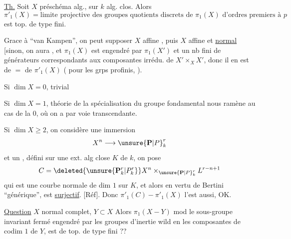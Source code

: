 \uline{Th.} Soit $X$ préschéma alg., sur $k$ alg. clos. Alors
\[
\pi'_1(X)=\text{limite projective des groupes quotients discrets de }\pi_1(X)
\text{ d'ordres premiers à }p
\]
est top. de type fini.

Grace à ``van Kampen'', on peut supposer $X$ affine
,
puis $X$ affine et \uline{normal}
[sinon, on aura
, et $\pi_1(X)$ est engendré par $\pi_1(X')$ et un nb fini de générateurs
correspondants aux composantes irrédu. de $X'\times_X X'$, donc il en est de $=$
de $\pi'_1(X)$
( pour les grps profinis,
). 

Si $\dim X=0$, trivial

Si $\dim X=1$, théorie de la spécialisation du groupe fondamental
nous ramène au cas de la  $0$, où on a
 par voie transcendante.

Si $\dim X\geq2$, on considère une immersion
\[
X^n\longrightarrow \unsure{\mathbf P|P}_k^r
\]
et un  
, défini sur une
ext. alg close $K$ de $k$, on pose
\[
C=\deleted{\unsure{\mathbf P_k^r|P_k^r}}X^n\times_{\unsure{\mathbf P|P}_k^r}L^{r-n+1}
\]
qui est une courbe normale de dim $1$ sur $K$, et alors en vertu de
Bertini ``générique'',
est \uline{surjectif}. [Réf]. Donc $\pi'_1(C)-\pi'_1(X)$ l'est
aussi, OK.

\uline{Question} $X$ normal complet, $Y\subset X$
Alors $\pi_1(X-Y)$ mod le sous-groupe invariant fermé engendré
par les groupes d'inertie wild en les composantes de
codim $1$ de $Y$, est de top. de type fini ??

